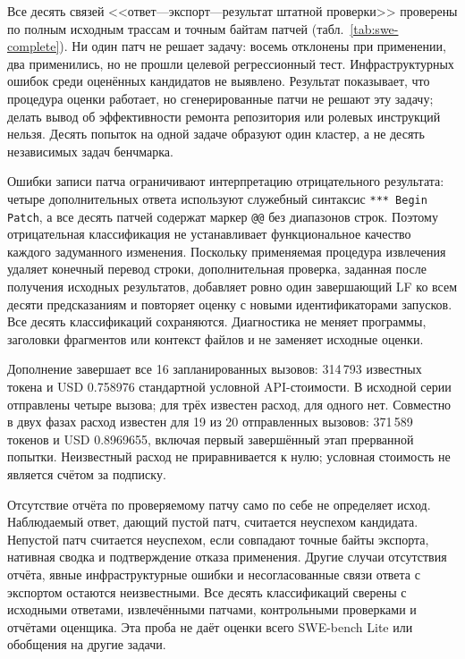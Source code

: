 Все десять связей <<ответ---экспорт---результат штатной проверки>> проверены по полным исходным трассам и точным байтам патчей (табл.~\ref{tab:swe-complete}). Ни один патч не решает задачу: восемь отклонены при применении, два применились, но не прошли целевой регрессионный тест. Инфраструктурных ошибок среди оценённых кандидатов не выявлено. Результат показывает, что процедура оценки работает, но сгенерированные патчи не решают эту задачу; делать вывод об эффективности ремонта репозитория или ролевых инструкций нельзя. Десять попыток на одной задаче образуют один кластер, а не десять независимых задач бенчмарка.

Ошибки записи патча ограничивают интерпретацию отрицательного результата: четыре дополнительных ответа используют служебный синтаксис \texttt{*** Begin Patch}, а все десять патчей содержат маркер \texttt{@@} без диапазонов строк. Поэтому отрицательная классификация не устанавливает функциональное качество каждого задуманного изменения. Поскольку применяемая процедура извлечения удаляет конечный перевод строки, дополнительная проверка, заданная после получения исходных результатов, добавляет ровно один завершающий LF ко всем десяти предсказаниям и повторяет оценку с новыми идентификаторами запусков. Все десять классификаций сохраняются. Диагностика не меняет программы, заголовки фрагментов или контекст файлов и не заменяет исходные оценки.

Дополнение завершает все 16 запланированных вызовов: 314\,793 известных токена и USD 0.758976 стандартной условной API-стоимости. В исходной серии отправлены четыре вызова; для трёх известен расход, для одного нет. Совместно в двух фазах расход известен для 19 из 20 отправленных вызовов: 371\,589 токенов и USD 0.8969655, включая первый завершённый этап прерванной попытки. Неизвестный расход не приравнивается к нулю; условная стоимость не является счётом за подписку.

Отсутствие отчёта по проверяемому патчу само по себе не определяет исход. Наблюдаемый ответ, дающий пустой патч, считается неуспехом кандидата. Непустой патч считается неуспехом, если совпадают точные байты экспорта, нативная сводка и подтверждение отказа применения. Другие случаи отсутствия отчёта, явные инфраструктурные ошибки и несогласованные связи ответа с экспортом остаются неизвестными. Все десять классификаций сверены с исходными ответами, извлечёнными патчами, контрольными проверками и отчётами оценщика. Эта проба не даёт оценки всего SWE-bench Lite или обобщения на другие задачи.

